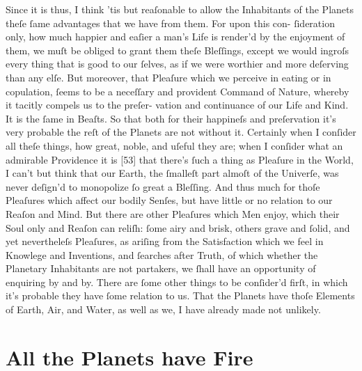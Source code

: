 \documentclass[letterpaper]{book}
\begin{document}
Since it is thus, I think 'tis but reaſonable to allow the Inhabitants of
the Planets theſe ſame advantages that we have from them. For upon this con-
ſideration only, how much happier and eaſier a man's Life is render'd by the
enjoyment of them, we muſt be obliged to grant them theſe Bleſſings, except
we would ingroſs every thing that is good to our ſelves, as if we were
worthier and more deſerving than any elſe. But moreover, that Pleaſure which
we perceive in eating or in copulation, ſeems to be a neceſſary and
provident Command of Nature, whereby it tacitly compels us to the preſer-
vation and continuance of our Life and Kind. It is the ſame in Beaſts. So
that both for their happineſs and preſervation it's very probable the reſt
of the Planets are not without it. Certainly when I conſider all theſe
things, how great, noble, and uſeful they are; when I conſider what an
admirable Providence it is [53] that there's ſuch a thing as Pleaſure in the
World, I can't but think that our Earth, the ſmalleſt part almoſt of the
Univerſe, was never deſign'd to monopolize ſo great a Bleſſing. And thus
much for thoſe Pleaſures which affect our bodily Senſes, but have little or
no relation to our Reaſon and Mind. But there are other Pleaſures which Men
enjoy, which their Soul only and Reaſon can reliſh: ſome airy and brisk,
others grave and ſolid, and yet nevertheleſs Pleaſures, as ariſing from the
Satisfaction which we feel in Knowlege and Inventions, and ſearches after
Truth, of which whether the Planetary Inhabitants are not partakers, we
ſhall have an opportunity of enquiring by and by.  There are ſome other
things to be conſider'd firſt, in which it's probable they have ſome
relation to us. That the Planets have thoſe Elements of Earth, Air, and
Water, as well as we, I have already made not unlikely.


\section{All the Planets have Fire}
\end{document}
